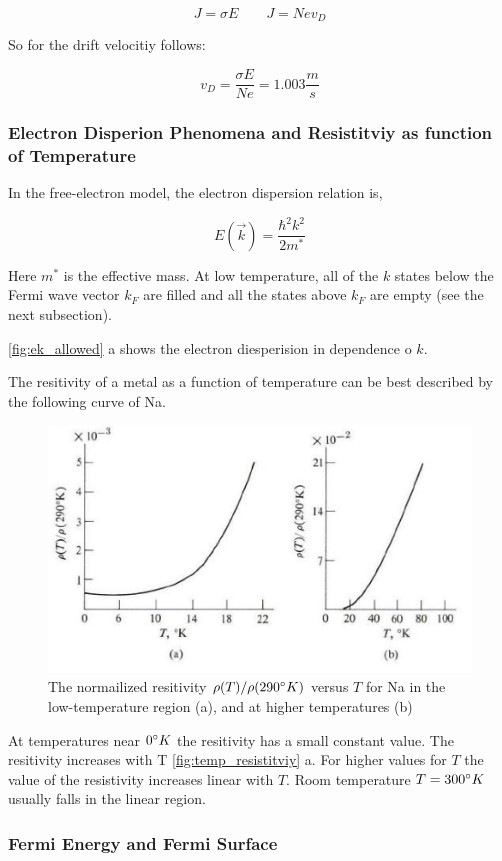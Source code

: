 $$J = \sigma E \qquad J = Nev_D$$

So for the drift velocitiy follows:

$$v_D =  \frac{\sigma E}{N e} = 1.003 \frac{m}{s}$$

\subsubsection*{Electron Disperion Phenomena and Resistitviy as function of Temperature}

In the free-electron model, the electron dispersion relation is,

$$E(\vec{k}) = \frac{\hbar^2k^2}{2m^*}$$

Here $m^*$ is the effective mass. At low temperature, all of
the $k$ states below the Fermi wave vector $k_F$ are filled 
and all the states above $k_F$ are empty (see the next subsection).

\autoref{fig:ek_allowed} a shows the electron diesperision in dependence o $k$.


The resitivity of a metal as a function of temperature can be best 
described by the following curve of Na.

\begin{figure}[H]
    \centering
    \includegraphics[width=0.6\linewidth]{Graphics/Chapter1/temp_resistitviy.png}
    \caption{The normailized resitivity $\rho(T)/\rho(290\degree K)$ versus $T$ 
    for Na in the low-temperature region (a), and at higher temperatures (b) 
    \cite[Elementary Solid State Physics p. 148]{elementary_SSP} }
    \label{fig:temp_resistitviy}
\end{figure}

At temperatures near $0 \degree K$ the resitivity has a small constant 
value. The resitivity increases with T \autoref{fig:temp_resistitviy} a.
For higher values for $T$ the value of the resistivity
increases linear with $T$. Room temperature $T=300\degree K$
usually falls in the linear region.

\subsubsection*{Fermi Energy and Fermi Surface}

